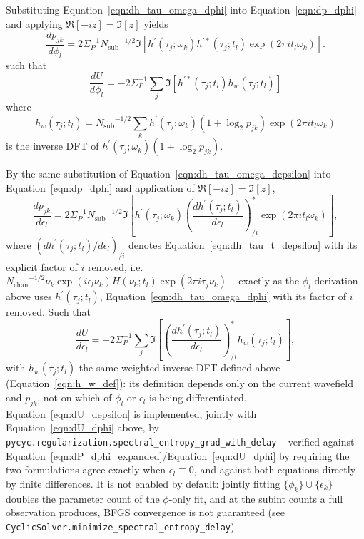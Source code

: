 \documentclass[manuscript]{aastex631}
\newcommand{\Nsub}{\ensuremath{N_\mathrm{sub}}}
\newcommand{\Nchan}{\ensuremath{N_\mathrm{chan}}}
\newcommand{\Eqn}[1]{Equation~\ref{eqn:#1}}
\begin{document}
%
Substituting \Eqn{dh_tau_omega_dphi} into \Eqn{dp_dphi} and
applying $\Re[-i z] = \Im[z]$ yields
%
\begin{equation}
\frac{dp_{jk}}{d\phi_l} = 2 \Sigma_P^{-1} \Nsub^{-1/2} \Im\left[ h^\prime(\tau_j;\omega_k) h^{\prime*}(\tau_j; t_l) \exp(2\pi i t_l \omega_k) \right].
    \label{eqn:dP_dphi_expanded}
\end{equation}
%
such that
%
\begin{equation}
\frac{dU}{d\phi_l} = - 2 \Sigma_P^{-1} \sum_j \Im\left[ h^{\prime*}(\tau_j; t_l) h_w(\tau_j; t_l) \right]
\label{eqn:dU_dphi}
\end{equation}
%
where
\begin{equation}
h_w(\tau_j; t_l) = \Nsub^{-1/2} \sum_k  h^\prime(\tau_j;\omega_k)   \left(1+\log_2 p_{jk} \right)  \exp(2\pi i t_l \omega_k)
\label{eqn:h_w_def}
\end{equation}
%
is the inverse DFT of
$h^\prime(\tau_j;\omega_k) \left(1+\log_2 p_{jk} \right)$.

By the same substitution of \Eqn{dh_tau_omega_depsilon} into \Eqn{dp_dphi}
and application of $\Re[-iz]=\Im[z]$,
%
\begin{equation}
\frac{dp_{jk}}{d\epsilon_l} = 2 \Sigma_P^{-1} \Nsub^{-1/2} \Im\left[ h^\prime(\tau_j;\omega_k) \left(\frac{dh^\prime(\tau_j;t_l)}{d\epsilon_l}\right)^*_{\!/i} \exp(2\pi i t_l \omega_k) \right],
\end{equation}
%
where $\left(dh^\prime(\tau_j;t_l)/d\epsilon_l\right)_{/i}$ denotes
\Eqn{dh_tau_t_depsilon} with its explicit factor of $i$ removed, i.e.
$\Nchan^{-1/2}\nu_k\exp(i\epsilon_l\nu_k)H(\nu_k;t_l)\exp(2\pi i\tau_j\nu_k)$
-- exactly as the $\phi_l$ derivation above uses $h^\prime(\tau_j;t_l)$,
\Eqn{dh_tau_omega_dphi} with its factor of $i$ removed. Such that
%
\begin{equation}
\frac{dU}{d\epsilon_l} = - 2 \Sigma_P^{-1} \sum_j \Im\left[ \left(\frac{dh^\prime(\tau_j;t_l)}{d\epsilon_l}\right)^*_{\!/i} h_w(\tau_j; t_l) \right],
\label{eqn:dU_depsilon}
\end{equation}
%
with $h_w(\tau_j;t_l)$ the same weighted inverse DFT defined above
(\Eqn{h_w_def}): its definition depends only on the current
wavefield and $p_{jk}$, not on which of $\phi_l$ or $\epsilon_l$ is being
differentiated. \Eqn{dU_depsilon} is implemented, jointly with
\Eqn{dU_dphi} above, by
\texttt{pycyc.regularization.spectral\_entropy\_grad\_with\_delay} --
verified against \Eqn{dP_dphi_expanded}/\Eqn{dU_dphi} by requiring the two
formulations agree exactly when $\epsilon_l\equiv0$, and against both
equations directly by finite differences. It is not enabled by default:
jointly fitting $\{\phi_k\}\cup\{\epsilon_k\}$ doubles the parameter count
of the $\phi$-only fit, and at the subint counts a full observation
produces, BFGS convergence is not guaranteed (see
\texttt{CyclicSolver.minimize\_spectral\_entropy\_delay}).
\end{document}
